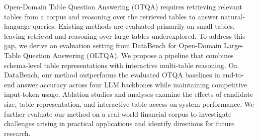 \begin{abstract}
開放域表格問答（OTQA）需要從表格集合中檢索相關表格，並透過推理回答自然語言查詢。然而，既有方法主要在小型表格上進行評估，對大型表格的檢索與推理仍缺乏系統性研究。為填補此缺口，本研究基於 DataBench 建立開放域大型表格問答（OLTQA）的評估設定，並提出結合表格結構層級表示與互動式多表推理的方法。在 DataBench 上，本方法在四種大型語言模型下皆取得優於所比較 OTQA 方法的端到端答案正確率，同時維持相對較低的模型輸入量。消融與分析實驗進一步探討候選表格數量、表格表示與互動式表格存取對系統表現的影響。此外，我們在真實金融資料上進行評估，探討此方法在實務應用中的挑戰，並指出未來研究方向。
\end{abstract}

\begin{abstract*}
Open-Domain Table Question Answering (OTQA) requires retrieving relevant tables from a corpus and reasoning over the retrieved tables to answer natural-language queries.
Existing methods are evaluated primarily on small tables, leaving retrieval and reasoning over large tables underexplored.
To address this gap, we derive an evaluation setting from DataBench for Open-Domain Large-Table Question Answering (OLTQA).
We propose a pipeline that combines schema-level table representations with interactive multi-table reasoning.
On DataBench, our method outperforms the evaluated OTQA baselines in end-to-end answer accuracy across four LLM backbones while maintaining competitive input-token usage.
Ablation studies and analyses examine the effects of candidate size, table representation, and interactive table access on system performance.
We further evaluate our method on a real-world financial corpus to investigate challenges arising in practical applications and identify directions for future research.
\end{abstract*}
